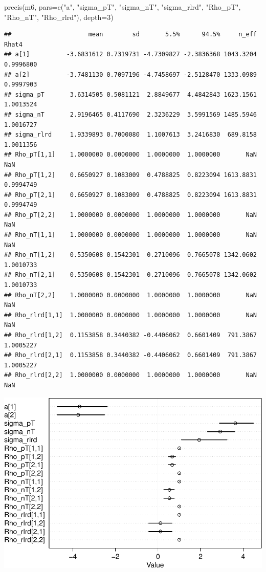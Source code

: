 \documentclass[
]{article}
\newenvironment{Shaded}{\begin{snugshade}}{\end{snugshade}}
\newcommand{\AttributeTok}[1]{\textcolor[rgb]{0.77,0.63,0.00}{#1}}
\newcommand{\DecValTok}[1]{\textcolor[rgb]{0.00,0.00,0.81}{#1}}
\newcommand{\FunctionTok}[1]{\textcolor[rgb]{0.00,0.00,0.00}{#1}}
\newcommand{\NormalTok}[1]{#1}
\newcommand{\StringTok}[1]{\textcolor[rgb]{0.31,0.60,0.02}{#1}}
\begin{document}
\begin{Shaded}
\begin{Highlighting}[]
\FunctionTok{precis}\NormalTok{(m6, }\AttributeTok{pars=}\FunctionTok{c}\NormalTok{(}\StringTok{"a"}\NormalTok{, }\StringTok{"sigma\_pT"}\NormalTok{, }\StringTok{"sigma\_nT"}\NormalTok{, }\StringTok{"sigma\_rlrd"}\NormalTok{,}
                  \StringTok{"Rho\_pT"}\NormalTok{, }\StringTok{"Rho\_nT"}\NormalTok{, }\StringTok{"Rho\_rlrd"}\NormalTok{), }\AttributeTok{depth=}\DecValTok{3}\NormalTok{)}
\end{Highlighting}
\end{Shaded}

\begin{verbatim}
##                     mean        sd       5.5%      94.5%     n_eff     Rhat4
## a[1]          -3.6831612 0.7319731 -4.7309827 -2.3836368 1043.3204 0.9996800
## a[2]          -3.7481130 0.7097196 -4.7458697 -2.5128470 1333.0989 0.9997903
## sigma_pT       3.6314505 0.5081121  2.8849677  4.4842843 1623.1561 1.0013524
## sigma_nT       2.9196465 0.4117690  2.3236229  3.5991569 1485.5946 1.0016727
## sigma_rlrd     1.9339893 0.7000080  1.1007613  3.2416830  689.8158 1.0011356
## Rho_pT[1,1]    1.0000000 0.0000000  1.0000000  1.0000000       NaN       NaN
## Rho_pT[1,2]    0.6650927 0.1083009  0.4788825  0.8223094 1613.8831 0.9994749
## Rho_pT[2,1]    0.6650927 0.1083009  0.4788825  0.8223094 1613.8831 0.9994749
## Rho_pT[2,2]    1.0000000 0.0000000  1.0000000  1.0000000       NaN       NaN
## Rho_nT[1,1]    1.0000000 0.0000000  1.0000000  1.0000000       NaN       NaN
## Rho_nT[1,2]    0.5350608 0.1542301  0.2710096  0.7665078 1342.0602 1.0010733
## Rho_nT[2,1]    0.5350608 0.1542301  0.2710096  0.7665078 1342.0602 1.0010733
## Rho_nT[2,2]    1.0000000 0.0000000  1.0000000  1.0000000       NaN       NaN
## Rho_rlrd[1,1]  1.0000000 0.0000000  1.0000000  1.0000000       NaN       NaN
## Rho_rlrd[1,2]  0.1153858 0.3440382 -0.4406062  0.6601409  791.3867 1.0005227
## Rho_rlrd[2,1]  0.1153858 0.3440382 -0.4406062  0.6601409  791.3867 1.0005227
## Rho_rlrd[2,2]  1.0000000 0.0000000  1.0000000  1.0000000       NaN       NaN
\end{verbatim}

\begin{center}\includegraphics{Geraldes-week08_files/figure-latex/unnamed-chunk-15-1} \end{center}
\end{document}
